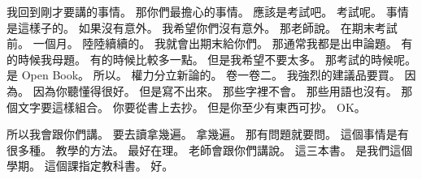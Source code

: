 \hypertarget{c01:cue:1055}{}我回到剛才要講的事情。
\hypertarget{c01:cue:1056}{}那你們最擔心的事情。
\hypertarget{c01:cue:1057}{}應該是考試吧。
\hypertarget{c01:cue:1058}{}考試呢。
\hypertarget{c01:cue:1059}{}事情是這樣子的。
\hypertarget{c01:cue:1060}{}如果沒有意外。
\hypertarget{c01:cue:1061}{}我希望你們沒有意外。
\hypertarget{c01:cue:1062}{}那老師說。
\hypertarget{c01:cue:1063}{}在期末考試前。
\hypertarget{c01:cue:1064}{}一個月。
\hypertarget{c01:cue:1065}{}陸陸續續的。
\hypertarget{c01:cue:1066}{}我就會出期末給你們。
\hypertarget{c01:cue:1067}{}那通常我都是出申論題。
\hypertarget{c01:cue:1068}{}有的時候我母題。
\hypertarget{c01:cue:1069}{}有的時候比較多一點。
\hypertarget{c01:cue:1070}{}但是我希望不要太多。
\hypertarget{c01:cue:1071}{}那考試的時候呢。
\hypertarget{c01:cue:1072}{}是 Open Book。
\hypertarget{c01:cue:1073}{}所以。
\hypertarget{c01:cue:1074}{}權力分立新論的。
\hypertarget{c01:cue:1075}{}卷一卷二。
\hypertarget{c01:cue:1076}{}我強烈的建議品要買。
\hypertarget{c01:cue:1077}{}因為。
\hypertarget{c01:cue:1078}{}因為你聽懂得很好。
\hypertarget{c01:cue:1079}{}但是寫不出來。
\hypertarget{c01:cue:1080}{}那些字裡不會。
\hypertarget{c01:cue:1081}{}那些用語也沒有。
\hypertarget{c01:cue:1082}{}那個文字要這樣組合。
\hypertarget{c01:cue:1083}{}你要從書上去抄。
\hypertarget{c01:cue:1084}{}但是你至少有東西可抄。
\hypertarget{c01:cue:1085}{}OK。

\hypertarget{c01:cue:1086}{}所以我會跟你們講。
\hypertarget{c01:cue:1087}{}要去讀拿幾遍。
\hypertarget{c01:cue:1088}{}拿幾遍。
\hypertarget{c01:cue:1089}{}那有問題就要問。
\hypertarget{c01:cue:1090}{}這個事情是有很多種。
\hypertarget{c01:cue:1091}{}教學的方法。
\hypertarget{c01:cue:1092}{}最好在理。
\hypertarget{c01:cue:1093}{}老師會跟你們講說。
\hypertarget{c01:cue:1094}{}這三本書。
\hypertarget{c01:cue:1095}{}是我們這個學期。
\hypertarget{c01:cue:1096}{}這個課指定教科書。
\hypertarget{c01:cue:1097}{}好。


